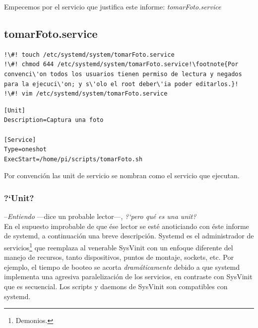 \documentclass[10pt,a4paper]{article}
\newenvironment{unitFrame}[1][]{%
    \begin{mdframed}[%
        frametitle={#1},
        skipabove=\baselineskip plus 2pt minus 1pt,
        skipbelow=\baselineskip plus 2pt minus 1pt,
        linewidth=0.5pt,
        frametitlerule=true,
        frametitlebackgroundcolor=gray!10
    ]%
}{%
    \end{mdframed}
}
\begin{document}
Empecemos por el servicio que justifica este informe: \emph{tomarFoto.service}

\subsection{tomarFoto.service}

\begin{lstlisting}
!\#! touch /etc/systemd/system/tomarFoto.service
!\#! chmod 644 /etc/systemd/system/tomarFoto.service!\footnote{Por convenci\'on todos los usuarios tienen permiso de lectura y negados para la ejecuci\'on; y s\'olo el root deber\'ia poder editarlos.}!
!\#! vim /etc/systemd/system/tomarFoto.service
\end{lstlisting}

\begin{scriptsize}
\begin{unitFrame}[/etc/systemd/system/tomarForo.service]
\begin{verbatim}
[Unit]
Description=Captura una foto

[Service]
Type=oneshot
ExecStart=/home/pi/scripts/tomarFoto.sh
\end{verbatim}
\end{unitFrame}
\end{scriptsize}

Por convenci\'on las unit de servicio se nombran como el servicio que ejecutan.

\subsubsection{?`Unit?}

--\emph{Entiendo} ---dice un probable lector---, \emph{?`pero qu\'e es una \emph{unit}?}\\

En el supuesto improbable de que \'ese lector se est\'e anoticiando con \'este informe de systemd, a continuaci\'on una breve descripci\'on. Systemd es el administrador de servicios\footnote{Demonios.} que reemplaza al venerable SysVinit con un enfoque diferente del manejo de recursos, tanto dispositivos, puntos de montaje, sockets, etc. Por ejemplo, el tiempo de booteo se acorta \emph{dram\'aticamente} debido a que systemd implementa una agresiva paralelizaci\'on de los servicios, en contraste con SysVinit que es secuencial. Los scripts y daemons de SysVinit son compatibles con systemd.\\
\end{document}
